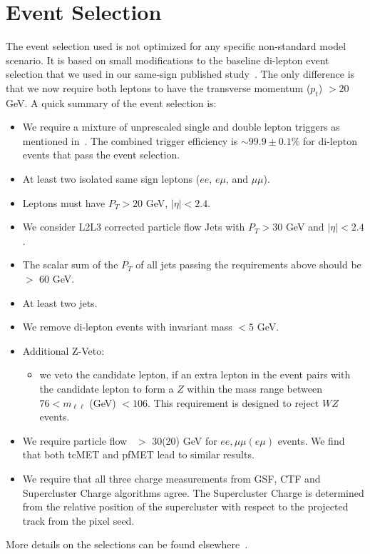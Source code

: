 \section{Event Selection}
\label{sec:eventselection}

The event selection used is not optimized for any specific non-standard model 
scenario. It is based on small modifications to the baseline 
di-lepton event selection that we used in our same-sign published study~\cite{ssnote1, sspaper}. The 
only difference is that we now require both leptons to have the transverse 
momentum ($p_t$) $> 20$ GeV. A quick summary of the event selection is:

\begin{itemize}
\item We require a mixture of unprescaled single and double lepton triggers as mentioned in~\cite{ssnote1}.
 The combined trigger efficiency is $\sim 99.9 \pm 0.1$\% for di-lepton events that pass the event selection.
\item At least two isolated same sign leptons ($ee$, $e\mu$, and $\mu\mu$). 
\item Leptons must have $P_T > 20$ GeV, $|\eta|< 2.4$.
\item We consider L2L3 corrected particle flow Jets with $P_T > 30$ GeV and
	$|\eta|< 2.4$.
\item The scalar sum of the $P_T$ of all jets passing the requirements above should be $>$ 60 GeV.
\item At least two jets.
\item We remove di-lepton events with invariant mass $ < 5$ GeV.

\item Additional Z-Veto:
\begin{itemize}
      \item  we veto the candidate lepton, if an extra lepton in the event pairs with the candidate lepton
             to form a $Z$ within the mass range between $76 < m_{\ell\ell} $ (GeV) $< 106$. This requirement is 
             designed to reject $WZ$ events.
\end{itemize}
\item We require particle flow \met~$>$ 30(20) GeV for $ee,\mu\mu (e\mu)$ events. 
We find that both tcMET and pfMET lead to similar results.
\item We require that all three charge measurements from GSF, CTF and Supercluster Charge algorithms agree. The
Supercluster Charge is determined from the relative position of the supercluster with respect to the projected
track from the pixel seed.
\end{itemize}
\noindent More details on the selections can be found elsewhere~\cite{ssnote1, sspaper}.
